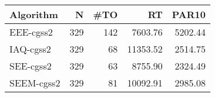 \begin{tabular}{lrrrr}
\toprule
 Algorithm &   N &  \#TO &       RT &   PAR10 \\
\midrule
 EEE-cgss2 & 329 &  142 &  7603.76 & 5202.44 \\
 IAQ-cgss2 & 329 &   68 & 11353.52 & 2514.75 \\
 SEE-cgss2 & 329 &   63 &  8755.90 & 2324.49 \\
SEEM-cgss2 & 329 &   81 & 10092.91 & 2985.08 \\
\bottomrule
\end{tabular}
